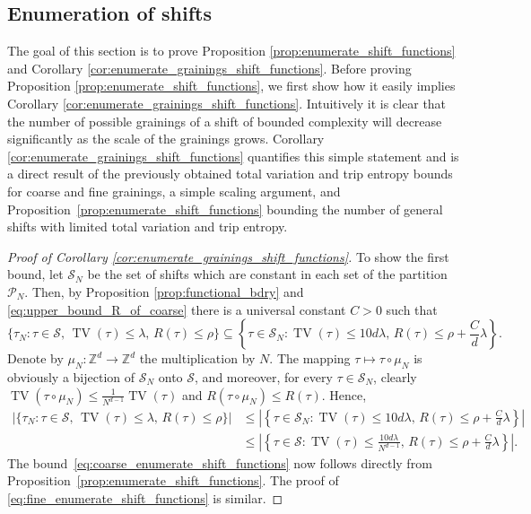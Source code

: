 \documentclass[11pt, reqno]{amsart}
\DeclareMathOperator{\TV}{TV}
\numberwithin{equation}{section}
\begin{document}
\subsection{Enumeration of shifts}
\label{sec:Enumeration} 
The goal of this section is to prove Proposition \ref{prop:enumerate_shift_functions} and Corollary \ref{cor:enumerate_grainings_shift_functions}.
Before proving Proposition \ref{prop:enumerate_shift_functions}, we first show how it easily implies Corollary \ref{cor:enumerate_grainings_shift_functions}.
Intuitively it is clear that the number of possible grainings of a shift of bounded complexity will decrease significantly as the scale of the grainings grows. 
Corollary \ref{cor:enumerate_grainings_shift_functions} quantifies this simple statement and is a direct result of the previously obtained total variation and trip entropy bounds for coarse and fine grainings, a simple scaling argument, and Proposition~\ref{prop:enumerate_shift_functions} bounding the number of general shifts with limited total variation and trip entropy.

\begin{proof}[Proof of Corollary \ref{cor:enumerate_grainings_shift_functions}]
To show the first bound, let ${\mathcal S}_N$ be the set of shifts which are constant in each set of the partition $\mathcal{P}_N$. Then, by Proposition \ref{prop:functional_bdry} and  \eqref{eq:upper_bound_R_of_coarse} there is a universal constant $C>0$ such that
\begin{equation*}\{\tau_{N}\colon\tau\in{\mathcal S},\, \TV(\tau) \leq \lambda,\, R(\tau)\leq \rho\} \subseteq \left\{\tau\in{\mathcal S}_N\colon \TV(\tau)\leq 10d \lambda,\, R(\tau)\leq  \rho +\frac{C}{d}\lambda\right\}. 
\end{equation*}
Denote by $\mu_N:{\mathbb Z}^d\to{\mathbb Z}^d$ the multiplication by $N$.   
The mapping $\tau\mapsto\tau\circ\mu_N$ is obviously a bijection of ${\mathcal S}_N$ onto $\mathcal S$, and moreover, for every $\tau\in{\mathcal S}_N$, clearly $\TV(\tau\circ\mu_N)\leq \frac{1}{N^{d-1}}\TV(\tau)$ and $R(\tau\circ\mu_N)\leq R(\tau)$. Hence,
\begin{align*}
\lvert\{\tau_{N}\colon\tau\in{\mathcal S},\, \TV(\tau) \leq \lambda,\, R(\tau)\leq \rho\}\rvert
&\leq\left\lvert\left\{\tau\in{\mathcal S}_N\colon \TV(\tau)\leq 10d \lambda,\, R(\tau)\leq  \rho +\frac{C}{d}\lambda\right\}\right\rvert\\
&\leq \left\lvert\left\{\tau\in{\mathcal S}\colon \TV(\tau)\leq \frac{10d \lambda}{N^{d-1}} ,\, R(\tau)\leq  \rho+\frac{C}{d}\lambda \right\}\right\rvert. 
\end{align*} 
The bound~\eqref{eq:coarse_enumerate_shift_functions} now follows directly from Proposition~\ref{prop:enumerate_shift_functions}.
The proof of \eqref{eq:fine_enumerate_shift_functions} is similar.
\end{proof}
\end{document}
